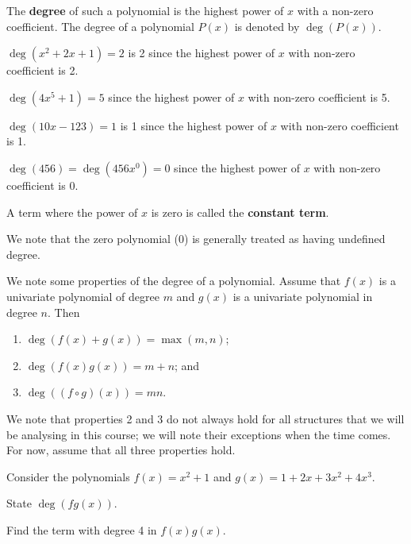 \begin{definition}
    The \textbf{degree} of such a polynomial is the highest power of $x$ with a non-zero coefficient. The degree of a polynomial $P(x)$ is denoted by $\deg(P(x))$.
\end{definition}
\begin{example}
    $\deg(x^2 + 2x + 1) = 2$ is 2 since the highest power of $x$ with non-zero coefficient is 2.
\end{example}
\begin{example}
    $\deg(4x^5 + 1) = 5$ since the highest power of $x$ with non-zero coefficient is 5.
\end{example}
\begin{example}
    $\deg(10x - 123) = 1$ is 1 since the highest power of $x$ with non-zero coefficient is 1.
\end{example}
\begin{example}
    $\deg(456) = \deg(456x^0) = 0$ since the highest power of $x$ with non-zero coefficient is 0.
\end{example}
\begin{definition}
    A term where the power of $x$ is zero is called the \textbf{constant term}.
\end{definition}
We note that the zero polynomial (0) is generally treated as having undefined degree.

We note some properties of the degree of a polynomial. Assume that $f(x)$ is a univariate polynomial of degree $m$ and $g(x)$ is a univariate polynomial in degree $n$. Then
\begin{enumerate}
    \item $\deg(f(x) + g(x)) = \max(m, n)$;
    \item $\deg(f(x)g(x)) = m+n$; and
    \item $\deg((f\circ g)(x)) = mn$.
\end{enumerate}
We note that properties 2 and 3 do not always hold for all structures that we will be analysing in this course; we will note their exceptions when the time comes. For now, assume that all three properties hold.

\begin{exercise}
    Consider the polynomials $f(x) = x^2 + 1$ and $g(x) = 1 + 2x + 3x^2 + 4x^3$.
    \begin{partquestions}{\alph*}
        \item State $\deg(fg(x))$.
        \item Find the term with degree 4 in $f(x)g(x)$.
    \end{partquestions}
\end{exercise}

